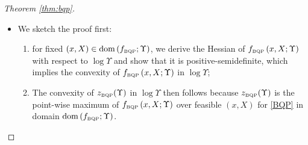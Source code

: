 \documentclass[smallextended]{svjour3hack}       %
\DeclareMathOperator{\Diag}{Diag}
\DeclareMathOperator{\dom}{dom}
\begin{document}
\begin{proof}[Theorem \ref{thm:bqp}]
\begin{itemize}
    \item[\ref{thm:bqp}.iii:] We sketch the proof first:
    \begin{enumerate}
        \item for fixed $(x,X)\in\dom\left(f_{{\tiny\mbox{BQP}}};\Upsilon\right)$, we derive the Hessian of $f_{{\tiny\mbox{BQP}}}\left(x,X;\Upsilon\right)$ with respect to $\log \Upsilon$ and show that it is positive-semidefinite, which implies the convexity of $f_{{\tiny\mbox{BQP}}}\left(x,X;\Upsilon\right)$ in $\log \Upsilon$;
        \item
        The convexity of $z_{{\tiny\mbox{BQP}}}(\Upsilon)$  in $\log \Upsilon$ then follows because $z_{{\tiny\mbox{BQP}}}(\Upsilon)$ is the point-wise maximum of $f_{{\tiny\mbox{BQP}}}\left(x,X;\Upsilon\right)$ over feasible $(x,X)$ for \ref{BQP} in domain $\dom\left(f_{{\tiny\mbox{BQP}}};\Upsilon\right)$.
    \end{enumerate}

    \smallskip


\end{itemize}
\end{proof}
\end{document}
